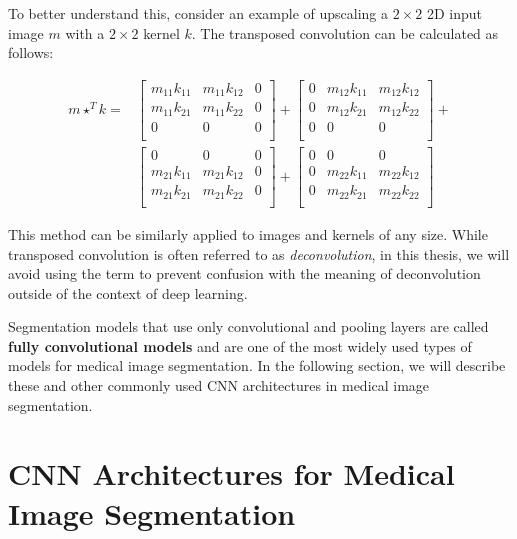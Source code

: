 To better understand this, consider an example of upscaling a $2 \times 2$ 2D input image $m$ with a $2 \times 2$ kernel $k$. The transposed convolution can be calculated as follows:

\begin{align*}
m \star^T k = & 
\begin{bmatrix}
m_{11}k_{11} & m_{11}k_{12} & 0\\
m_{11}k_{21} & m_{11}k_{22} & 0\\
0 & 0 & 0\\
\end{bmatrix}
+
\begin{bmatrix}
0 & m_{12}k_{11} & m_{12}k_{12}\\
0 & m_{12}k_{21} & m_{12}k_{22}\\
0 & 0 & 0\\
\end{bmatrix}
+\\
&
\begin{bmatrix}
0 & 0 & 0\\
m_{21}k_{11} & m_{21}k_{12} & 0\\
m_{21}k_{21} & m_{21}k_{22} & 0\\
\end{bmatrix}
+
\begin{bmatrix}
0 & 0 & 0\\
0 & m_{22}k_{11} & m_{22}k_{12}\\
0 & m_{22}k_{21} & m_{22}k_{22}\\
\end{bmatrix}
\end{align*}

This method can be similarly applied to images and kernels of any size. While transposed convolution is often referred to as \textit{deconvolution}, in this thesis, we will avoid using the term to prevent confusion with the meaning of deconvolution outside of the context of deep learning.

Segmentation models that use only convolutional and pooling layers are called \textbf{fully convolutional models} and are one of the most widely used types of models for medical image segmentation. In the following section, we will describe these and other commonly used CNN architectures in medical image segmentation.

\section{CNN Architectures for Medical Image Segmentation}

